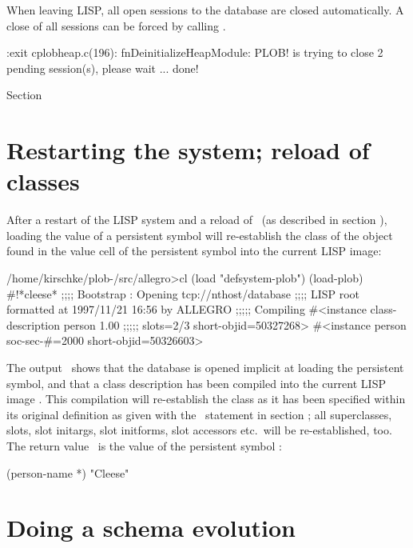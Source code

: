 When leaving LISP, all open sessions to the database are closed
automatically. A close of all sessions can be forced by calling
.
\begin{CompactCode}
\listener{}:exit
cplobheap.c(196): fnDeinitializeHeapModule:
  PLOB! is trying to close 2 pending session(s), please wait ... done!
\end{CompactCode}

 Section 

\section[Restarting the system]%
{Restarting the system; reload of classes}

\ResetListener After a restart of the LISP system and a reload of
\plob\ (as described in section ), loading
the value of a persistent symbol will re-establish the class of the
object found in the value cell of the persistent symbol into the
current LISP image:
\begin{CompactCode}
/home/kirschke/plob-\thisversion/src/allegro>cl
\OmitUnimportant
\listener{}(load "defsystem-plob")
\OmitUnimportant
\listener{}(load-plob)
\OmitUnimportant
\listener{}#!*cleese*
;;;; Bootstrap   : Opening tcp://nthost/database\marginnumber{\smalloi}
\OmitUnimportant
;;;; LISP root formatted at 1997/11/21 16:56 by ALLEGRO
;;;;; Compiling #<instance class-description person 1.00\marginnumber{\smalloii}
;;;;;                      slots=2/3 short-objid=50327268>
#<instance person soc-sec-#=2000 short-objid=50326603>\marginnumber{\smalloiii}
\end{CompactCode}

The output \oi\ shows that the database is opened implicit at loading
the persistent symbol, and that a class description has been compiled
into the current LISP image \oii. This compilation will re-establish
the class as it has been specified within its original definition as
given with the \ statement in section
; all superclasses, slots, slot
initargs, slot initforms, slot accessors etc.\ will be re-established,
too. The return value \oiii\ is the value of the persistent symbol
:
\begin{CompactCode}
\listener{}(person-name *)
"Cleese"
\end{CompactCode}

\section{Doing a schema evolution}

